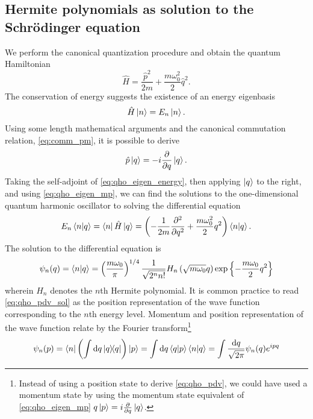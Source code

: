 \subsection{Hermite polynomials as solution to the Schrödinger equation}

We perform the canonical quantization procedure and obtain the quantum Hamiltonian
\begin{equation}
    \hat{H}
    =
    \frac{\hat{p}^2}{2m}
    +
    \frac{m\omega_0^2}{2}\hat{q}^2
    \label{eq:qho_hamilton}.
\end{equation}
The conservation of energy suggests the existence of an energy eigenbasis
\begin{equation}
    \hat{H}\ket{n}
    =
    E_n\ket{n}
    \label{eq:qho_eigen_energy}.
\end{equation}
Using some length mathematical arguments and the canonical commutation relation, \cref{eq:comm_pm}, it is possible to derive~\cite[p.~27]{Mukhanov2007}
\begin{equation}
    \hat{p}\ket{q}
    =
    -i\pdv{q}\ket{q}
    \label{eq:qho_eigen_mp}.
\end{equation}
Taking the self-adjoint of \cref{eq:qho_eigen_energy}, then applying $\ket{q}$ to the right, and using \cref{eq:qho_eigen_mp}, we can find the solutions to the one-dimensional quantum harmonic oscillator to solving the differential equation
\begin{equation}
    E_n\braket{n}{q}
    =
    \bra{n}\hat{H}\ket{q}
    =
    \left(-\frac{1}{2m}\pdv[2]{q}+\frac{m\omega_0^2}{2}q^2\right)\braket{n}{q}
    \label{eq:qho_pdv}.
\end{equation}
The solution to the differential equation is~\cite[p.~51]{Griffiths2017}
\begin{equation}
    \psi_n(q)
    =
    \braket{n}{q}
    =
    \left(\frac{m\omega_0}{\pi}\right)^{1/4}
    \frac{1}{\sqrt{2^nn!}}
    H_n\left(\sqrt{m\omega_0}q\right)
    \exp\left\{-\frac{m\omega_0}{2}q^2\right\}
    \label{eq:qho_pdv_sol}
\end{equation}
wherein $H_n$ denotes the $n$th Hermite polynomial.
It is common practice to read \cref{eq:qho_pdv_sol} as the position representation of the wave function corresponding to the $n$th energy level.
Momentum and position representation of the wave function relate by the Fourier transform\footnote{Instead of using a position state to derive \cref{eq:qho_pdv}, we could have used a momentum state by using the momentum state equivalent of \cref{eq:qho_eigen_mp} $q\ket{p}=i\pdv{q}\ket{q}$.}
\begin{equation}
    \psi_n(p)
    =
    \bra{n}\left(\int\dd{q}\ketbra{q}{q}\right)\ket{p}
    =
    \int\dd{q}\braket{q}{p}\braket{n}{q}
    =
    \int\frac{\dd{q}}{\sqrt{2\pi}}\psi_n(q)e^{ipq}
    \label{eq:qho_pdv_sol_mom}
\end{equation}
